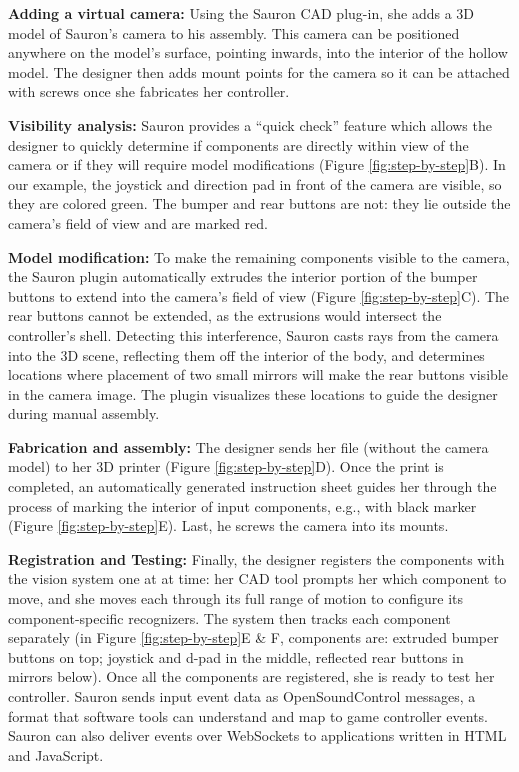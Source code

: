 \textbf{Adding a virtual camera:} Using the Sauron CAD plug-in, she adds a 3D model of Sauron's camera to his assembly. This camera can be positioned anywhere on the model's surface, pointing inwards, into the interior of the hollow model. The designer then adds mount points for the camera so it can be attached with screws once she fabricates her controller.

\textbf{Visibility analysis:} Sauron provides a ``quick check'' feature which allows the designer to quickly determine if components are directly within view of the camera or if they will require model modifications (Figure \ref{fig:step-by-step}B). %
In our example, the joystick and direction pad in front of the camera are visible, so they are colored green.  The bumper and rear buttons are not: they lie outside the camera's field of view and are marked red.  

\textbf{Model modification:} To make the remaining components visible to the camera, the Sauron plugin automatically extrudes the interior portion of the bumper buttons to extend into the camera's field of view (Figure \ref{fig:step-by-step}C).  The rear buttons cannot be extended, as the extrusions would intersect the controller's shell. Detecting this interference, Sauron casts rays from the camera into the 3D scene, reflecting them off the interior of the body, and determines locations where placement of two small mirrors will make the rear buttons visible in the camera image.  The plugin visualizes these locations to guide the designer during manual assembly.

\textbf{Fabrication and assembly:} %
The designer sends her file (without the camera model) to her 3D printer (Figure \ref{fig:step-by-step}D). Once the print is completed, an automatically generated instruction sheet guides her through the process of marking the interior of input components, e.g., with black marker (Figure \ref{fig:step-by-step}E).  Last, he screws the camera into its mounts.  

\textbf{Registration and Testing:} Finally, the designer registers the components with the vision system one at at time: her CAD tool prompts her which component to move, and she moves each through its full range of motion to configure its component-specific recognizers. The system then tracks each component separately (in Figure \ref{fig:step-by-step}E \& F, components are: extruded bumper buttons on top; joystick and d-pad in the middle, reflected rear buttons in mirrors below). Once all the components are registered, she is ready to test her controller.
Sauron sends input event data as OpenSoundControl messages, a format that software tools can understand and map to game controller events. Sauron can also deliver events over WebSockets to applications written in HTML and JavaScript.

